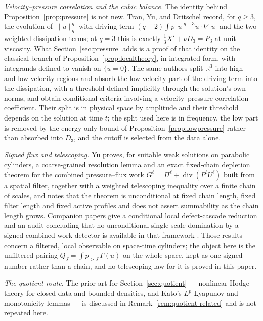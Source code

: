 \documentclass[11pt]{article}
\theoremstyle{definition}
\theoremstyle{plain}
\begin{document}
\emph{Velocity--pressure correlation and the cubic balance.}  The identity
behind Proposition~\ref{prop:pressure} is not new.  Tran, Yu, and Dritschel
\cite[eq.~(2.2)]{TranYuDritschel2021} record, for $q\ge3$, the evolution of
$\|u\|_q^q$ with driving term $(q-2)\int p\,|u|^{q-3}u\cdot\nabla|u|$ and
the two weighted dissipation terms; at $q=3$ this is exactly
$\tfrac13X'+\nu D_3=P_3$ at unit viscosity.  What Section~\ref{sec:pressure}
adds is a proof of that identity on the classical branch of
Proposition~\ref{prop:localtheory}, in integrated form, with integrands
defined to vanish on $\{u=0\}$.  The same authors split $\mathbb R^3$ into
high- and low-velocity regions and absorb the low-velocity part of the
driving term into the dissipation, with a threshold defined implicitly
through the solution's own norms, and obtain conditional criteria involving
a velocity--pressure correlation coefficient.  Their split is in physical
space by amplitude and their threshold depends on the solution at time $t$;
the split used here is in frequency, the low part is removed by the
energy-only bound of Proposition~\ref{prop:lowpressure} rather than absorbed
into $D_3$, and the cutoff is selected from the data alone.

\emph{Signed flux and telescoping.}  Yu \cite{Yu2026a} proves, for suitable
weak solutions on parabolic cylinders, a coarse-grained resolution lemma and
an exact fixed-chain depletion theorem for the combined pressure--flux work
$G^\ell=\Pi^\ell+\operatorname{div}(P^\ell U^\ell)$ built from a spatial
filter, together with a weighted telescoping inequality over a finite chain
of scales, and notes that the theorem is unconditional at fixed chain length,
fixed filter length and fixed active profiles and does not assert
summability as the chain length grows.  Companion papers give a conditional local
defect-cascade reduction \cite{Yu2026c} and an audit concluding that no
unconditional single-scale domination by a signed combined-work detector is
available in that framework \cite{Yu2026b}.  Those results concern a
filtered, local observable on space-time cylinders; the object here is the
unfiltered pairing
$Q_J=\int p_{>J}\,\Gamma(u)$ on the whole space, kept as one signed number
rather than a chain, and no telescoping law for it is proved in this paper.

\emph{The quotient route.}  The prior art for
Section~\ref{sec:quotient} --- nonlinear Hodge theory for closed data and
bounded densities, and Kato's $L^p$ Lyapunov and monotonicity lemmas --- is
discussed in Remark~\ref{rem:quotient-related} and is not repeated here.
\end{document}
